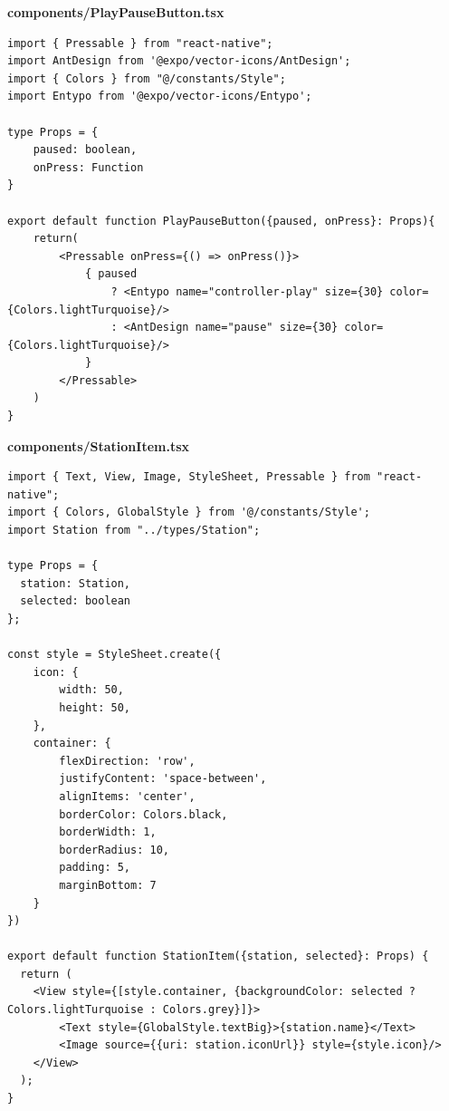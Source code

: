 \documentclass[11pt, twoside]{article}
\begin{document}
\textbf{components/PlayPauseButton.tsx}
\begin{lstlisting}
import { Pressable } from "react-native";
import AntDesign from '@expo/vector-icons/AntDesign';
import { Colors } from "@/constants/Style";
import Entypo from '@expo/vector-icons/Entypo';

type Props = {
    paused: boolean,
    onPress: Function
}

export default function PlayPauseButton({paused, onPress}: Props){
    return(
        <Pressable onPress={() => onPress()}>
            { paused 
                ? <Entypo name="controller-play" size={30} color={Colors.lightTurquoise}/>
                : <AntDesign name="pause" size={30} color={Colors.lightTurquoise}/>
            }
        </Pressable>
    )
}
\end{lstlisting}

\textbf{components/StationItem.tsx}
\begin{lstlisting}
import { Text, View, Image, StyleSheet, Pressable } from "react-native";
import { Colors, GlobalStyle } from '@/constants/Style';
import Station from "../types/Station";

type Props = {
  station: Station,
  selected: boolean
};

const style = StyleSheet.create({
    icon: {
        width: 50,
        height: 50,
    },
    container: {
        flexDirection: 'row',
        justifyContent: 'space-between',
        alignItems: 'center',
        borderColor: Colors.black,
        borderWidth: 1,
        borderRadius: 10,
        padding: 5,
        marginBottom: 7
    }
})

export default function StationItem({station, selected}: Props) {
  return (
    <View style={[style.container, {backgroundColor: selected ? Colors.lightTurquoise : Colors.grey}]}>
        <Text style={GlobalStyle.textBig}>{station.name}</Text>
        <Image source={{uri: station.iconUrl}} style={style.icon}/>
    </View>
  );
}
\end{lstlisting}
\end{document}
